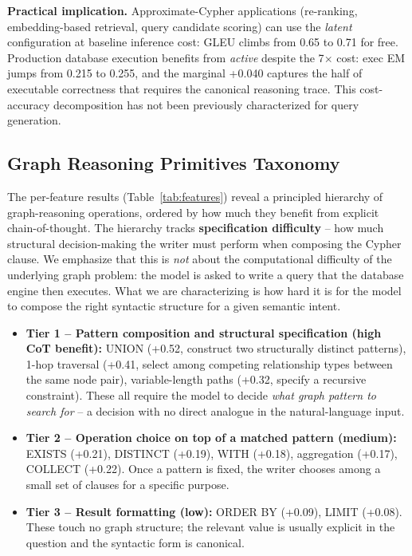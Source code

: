 \documentclass[11pt]{article}
\begin{document}
\textbf{Practical implication.} Approximate-Cypher applications (re-ranking, embedding-based retrieval, query candidate scoring) can use the \emph{latent} configuration at baseline inference cost: GLEU climbs from 0.65 to 0.71 for free. Production database execution benefits from \emph{active} despite the 7$\times$ cost: exec EM jumps from 0.215 to 0.255, and the marginal +0.040 captures the half of executable correctness that requires the canonical reasoning trace. This cost-accuracy decomposition has not been previously characterized for query generation.

\subsection{Graph Reasoning Primitives Taxonomy}

The per-feature results (Table~\ref{tab:features}) reveal a principled hierarchy of graph-reasoning operations, ordered by how much they benefit from explicit chain-of-thought. The hierarchy tracks \textbf{specification difficulty} -- how much structural decision-making the writer must perform when composing the Cypher clause. We emphasize that this is \emph{not} about the computational difficulty of the underlying graph problem: the model is asked to write a query that the database engine then executes. What we are characterizing is how hard it is for the model to compose the right syntactic structure for a given semantic intent.

\begin{itemize}[leftmargin=*]
\item \textbf{Tier 1 -- Pattern composition and structural specification (high CoT benefit):} UNION (+0.52, construct two structurally distinct patterns), 1-hop traversal (+0.41, select among competing relationship types between the same node pair), variable-length paths (+0.32, specify a recursive constraint). These all require the model to decide \emph{what graph pattern to search for} -- a decision with no direct analogue in the natural-language input.
\item \textbf{Tier 2 -- Operation choice on top of a matched pattern (medium):} EXISTS (+0.21), DISTINCT (+0.19), WITH (+0.18), aggregation (+0.17), COLLECT (+0.22). Once a pattern is fixed, the writer chooses among a small set of clauses for a specific purpose.
\item \textbf{Tier 3 -- Result formatting (low):} ORDER BY (+0.09), LIMIT (+0.08). These touch no graph structure; the relevant value is usually explicit in the question and the syntactic form is canonical.
\end{itemize}
\end{document}
